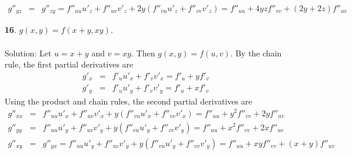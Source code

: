 \documentclass[12pt]{amsbook}
\begin{document}
\begin{enumerate}
\begin{eqnarray*}
g''_{yz}&=&g''_{zy}=f''_{uu}u'_z+f''_{uv}v'_z+2y(f''_{vu}u'_z+f''_{vv}v'_z)=f''_{uu}+4yzf''_{vv}+(2y+2z)f''_{uv}
\end{eqnarray*}
\item[{\small\bf 16}.] $g(x,y)=f(x+y,xy)$.
\\
\\
{\sc Solution}: Let $u=x+y$ and $v=xy$. Then $g(x,y)=f(u,v)$. By the chain rule, the first partial derivatives are
\begin{eqnarray*}
g'_x&=&f'_uu'_x+f'_vv'_x=f'_u+yf'_v \\
g'_y&=&f'_uu'_y+f'_vv'_y=f'_u+xf'_v
\end{eqnarray*}
Using the product and chain rules, the second partial derivatives are
\begin{eqnarray*}
g''_{xx}&=& f''_{uu}u'_x+f''_{uv}v'_x+y(f''_{vu}u'_x+f''_{vv}v'_x)=f''_{uu}+y^2f''_{vv}+2yf''_{uv}\\
g''_{yy}&=& f''_{uu}u'_y+f''_{uv}v'_y+y(f''_{vu}u'_y+f''_{vv}v'_y)=f''_{uu}+x^2f''_{vv}+2xf''_{uv}\\
g''_{xy}&=&g''_{yx}=f''_{uu}u'_y+f''_{uv}v'_y+y(f''_{vu}u'_y+f''_{vv}v'_y)=f''_{uu}+xyf''_{vv}+(x+y)f''_{uv}
\end{eqnarray*}
\end{enumerate}
\end{document}

